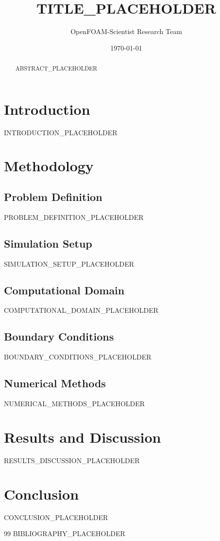 \documentclass[11pt,a4paper]{article}
\title{TITLE_PLACEHOLDER}
\author{OpenFOAM-Scientist Research Team}
\date{\today}
\begin{document}
\maketitle

\begin{abstract}
ABSTRACT_PLACEHOLDER
\end{abstract}

\section{Introduction}
INTRODUCTION_PLACEHOLDER

\section{Methodology}
\subsection{Problem Definition}
PROBLEM_DEFINITION_PLACEHOLDER

\subsection{Simulation Setup}
SIMULATION_SETUP_PLACEHOLDER

\subsection{Computational Domain}
COMPUTATIONAL_DOMAIN_PLACEHOLDER

\subsection{Boundary Conditions}
BOUNDARY_CONDITIONS_PLACEHOLDER

\subsection{Numerical Methods}
NUMERICAL_METHODS_PLACEHOLDER

\section{Results and Discussion}
RESULTS_DISCUSSION_PLACEHOLDER

\section{Conclusion}
CONCLUSION_PLACEHOLDER


\begin{thebibliography}{99}
BIBLIOGRAPHY_PLACEHOLDER
\end{thebibliography}
\end{document}
